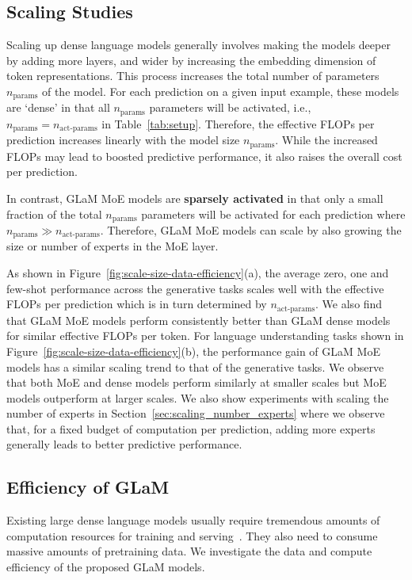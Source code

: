 \subsection{Scaling Studies}\label{sec:model_scaling}
Scaling up dense language models generally involves making the models deeper by adding more layers, and wider by increasing the embedding dimension of token representations. This process increases the total number of parameters $n_{\text{params}}$ of the model. For each prediction on a given input example, these models are `dense' in that all $n_{\text{params}}$ parameters will be activated, i.e., $n_{\text{params}} = n_{\text{act-params}}$ in Table~\ref{tab:setup}. Therefore, the effective FLOPs per prediction increases linearly with the model size $n_{\text{params}}$. While the increased FLOPs may lead to boosted predictive performance, it also raises the overall cost per prediction.

In contrast, GLaM MoE models are \textbf{sparsely activated} in that only a small fraction of the total $n_{\text{params}}$ parameters will be activated for each prediction where $n_{\text{params}} \gg n_{\text{act-params}}$. Therefore, GLaM MoE models can scale by also growing the size or number of experts in the MoE layer.

As shown in Figure~\ref{fig:scale-size-data-efficiency}(a), the average zero, one and few-shot performance across the generative tasks scales well with the effective FLOPs per prediction which is in turn determined by $n_{\text{act-params}}$. We also find that GLaM MoE models perform consistently better than GLaM dense models for similar effective FLOPs per token. For language understanding tasks shown in Figure~\ref{fig:scale-size-data-efficiency}(b), the performance gain of GLaM MoE models has a similar scaling trend to that of the generative tasks. We observe that both MoE and dense models perform similarly at smaller scales but MoE models outperform at larger scales. We also show experiments with scaling the number of experts in Section~\ref{sec:scaling_number_experts} where we observe that, for a fixed budget of computation per prediction, adding more experts generally leads to better predictive performance.

\subsection{Efficiency of GLaM} Existing large dense language models usually require tremendous amounts of computation resources for training and serving~\cite{patterson2021carbon}. They also need to consume massive amounts of pretraining data. We investigate the data and compute efficiency of the proposed GLaM models.

